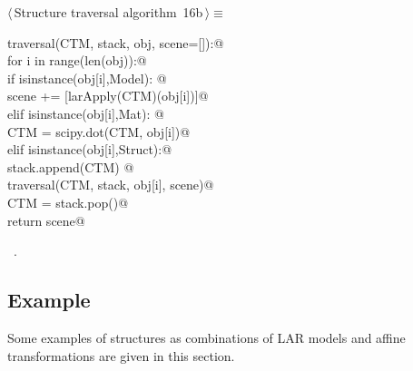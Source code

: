 \documentclass[11pt,oneside]{article}	%
\begin{document}
\begin{flushleft} \small \label{scrap30}
\protect{}$\langle\,$Structure traversal algorithm\nobreak\ {\footnotesize 16b}$\,\rangle\equiv$
\vspace{-1ex}
\begin{list}{}{} \item
\mbox{}\verb@def traversal(CTM, stack, obj, scene=[]):@\\
\mbox{}\verb@    for i in range(len(obj)):@\\
\mbox{}\verb@        if isinstance(obj[i],Model): @\\
\mbox{}\verb@            scene += [larApply(CTM)(obj[i])]@\\
\mbox{}\verb@        elif isinstance(obj[i],Mat): @\\
\mbox{}\verb@            CTM = scipy.dot(CTM, obj[i])@\\
\mbox{}\verb@        elif isinstance(obj[i],Struct):@\\
\mbox{}\verb@            stack.append(CTM) @\\
\mbox{}\verb@            traversal(CTM, stack, obj[i], scene)@\\
\mbox{}\verb@            CTM = stack.pop()@\\
\mbox{}\verb@    return scene@\\
\mbox{}\verb@@{\NWsep}
\end{list}
\vspace{-1ex}
\footnotesize\addtolength{\baselineskip}{-1ex}
\begin{list}{}{\setlength{\itemsep}{-\parsep}\setlength{\itemindent}{-\leftmargin}}
\item \NWtxtMacroRefIn\ .
\end{list}
\end{flushleft}


\subsection{Example}
Some examples of structures as combinations of LAR models and affine transformations are given in this section. 
\end{document}
